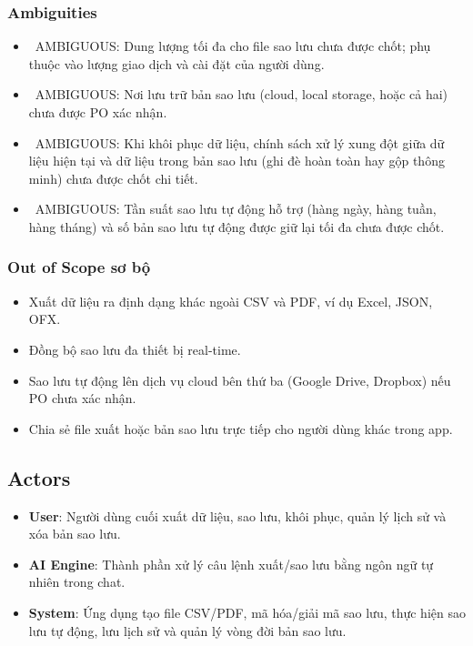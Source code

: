 \subsubsection{Ambiguities}

\begin{itemize}
\item \warningicon\  AMBIGUOUS: Dung lượng tối đa cho file sao lưu chưa được chốt; phụ thuộc vào lượng giao dịch và cài đặt của người dùng.
\item \warningicon\  AMBIGUOUS: Nơi lưu trữ bản sao lưu (cloud, local storage, hoặc cả hai) chưa được PO xác nhận.
\item \warningicon\  AMBIGUOUS: Khi khôi phục dữ liệu, chính sách xử lý xung đột giữa dữ liệu hiện tại và dữ liệu trong bản sao lưu (ghi đè hoàn toàn hay gộp thông minh) chưa được chốt chi tiết.
\item \warningicon\  AMBIGUOUS: Tần suất sao lưu tự động hỗ trợ (hàng ngày, hàng tuần, hàng tháng) và số bản sao lưu tự động được giữ lại tối đa chưa được chốt.
\end{itemize}
\subsubsection{Out of Scope sơ bộ}

\begin{itemize}
\item Xuất dữ liệu ra định dạng khác ngoài CSV và PDF, ví dụ Excel, JSON, OFX.
\item Đồng bộ sao lưu đa thiết bị real-time.
\item Sao lưu tự động lên dịch vụ cloud bên thứ ba (Google Drive, Dropbox) nếu PO chưa xác nhận.
\item Chia sẻ file xuất hoặc bản sao lưu trực tiếp cho người dùng khác trong app.
\end{itemize}
\subsection{Actors}

\begin{itemize}
\item \textbf{User}: Người dùng cuối xuất dữ liệu, sao lưu, khôi phục, quản lý lịch sử và xóa bản sao lưu.
\item \textbf{AI Engine}: Thành phần xử lý câu lệnh xuất/sao lưu bằng ngôn ngữ tự nhiên trong chat.
\item \textbf{System}: Ứng dụng tạo file CSV/PDF, mã hóa/giải mã sao lưu, thực hiện sao lưu tự động, lưu lịch sử và quản lý vòng đời bản sao lưu.
\end{itemize}
